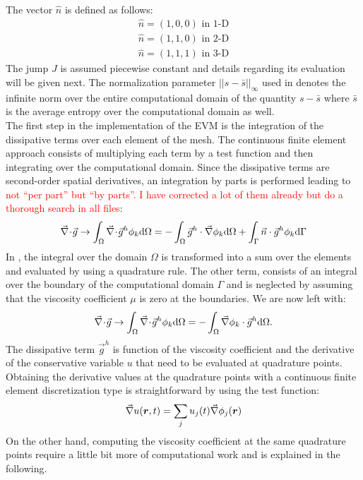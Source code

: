 %
The vector $\hat{n}$ is defined as follows:
\begin{eqnarray}\label{eq:bg_hat_sect2}
\hat{n} = \left( 1, 0, 0 \right) \text{ in 1-D} \nonumber \\
\hat{n} = \left( 1, 1, 0 \right) \text{ in 2-D} \nonumber \\
\hat{n} = \left( 1, 1, 1 \right) \text{ in 3-D} \nonumber
\end{eqnarray}
The jump $J$ is assumed piecewise constant and details regarding its evaluation will be given next. The normalization parameter $|| s - \bar{s} ||_\infty$ used in  denotes the infinite norm over the entire computational domain of the quantity $s - \bar{s}$ where $\bar{s}$ is the average entropy over the computational domain as well.\\
The first step in the implementation of the EVM is the integration of the dissipative terms over each element of the mesh. The continuous finite element approach consists of multiplying each term by a test function and then integrating over the computational domain. Since the dissipative terms are second-order spatial derivatives, an integration by parts is performed leading to \textcolor{red}{not ``per part'' but ``by parts''. I have corrected a lot of them already but do a thorough search in all files}:
%
\begin{equation}\label{eq:diss_term_sct2}
\vec{\nabla}\! \cdot \! \vec{g} \rightarrow \int_\Omega \vec{\nabla}\! \cdot \! \vec{g}^h \phi_k \text{d}\Omega  = -\int_\Omega \vec{g}^h \cdot \vec{\nabla} \phi_k \text{d}\Omega + \int_\Gamma \vec{n} \cdot \vec{g}^h \phi_k \text{d}\Gamma
\end{equation} 
%
In , the integral over the domain $\Omega$ is transformed into a sum over the elements and evaluated by using a quadrature rule. The other term, consists of an integral over the boundary of the computational domain $\Gamma$ and is neglected by assuming that the viscosity coefficient $\mu$ is zero at the boundaries. We are now left with:
\begin{equation}\label{eq:diss_term2_sct2}
\vec{\nabla}\! \cdot \! \vec{g} \rightarrow \int_\Omega \vec{\nabla}\! \cdot \! \vec{g}^h \phi_k \text{d}\Omega  = -\int_\Omega \vec{\nabla} \phi_k \cdot \vec{g}^h\text{d}\Omega.
\end{equation} 
%
The dissipative term $\vec{g}^h$ is function of the viscosity coefficient and the derivative of the conservative variable $u$ that need to be evaluated at quadrature points. Obtaining the derivative values at the quadrature points with a continuous finite element discretization type is straightforward by using the test function: 
%
\begin{equation}
\vec{\nabla} u(\boldsymbol r,t) = \sum_j u_j(t) \vec{\nabla} \phi_j(\boldsymbol r)
\end{equation}
%
On the other hand, computing the viscosity coefficient at the same quadrature points require a little bit more of computational work and is explained in the following. \\

